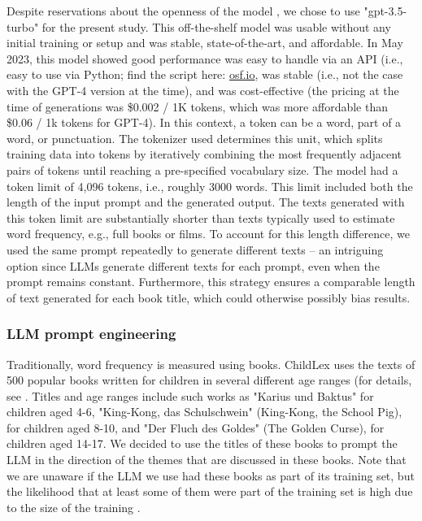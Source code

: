 \documentclass[doc, a4paper]{apa7}
\begin{document}
Despite reservations about the openness of the model \citep[see, e.g., ][]{liesenfeld_opening_2023, hussain_tutorial_2024}, we chose to use "gpt-3.5-turbo" for the present study. This off-the-shelf model was usable without any initial training or setup and was stable, state-of-the-art, and affordable. In May 2023, this model showed good performance was easy to handle via an API (i.e., easy to use via Python; find the script here: \href{https://osf.io/wmuvj/?view_only=06ba6b0ec23248df8a1418add4da05a0}{osf.io}, was stable (i.e., not the case with the GPT-4 version at the time), and was cost-effective (the pricing at the time of generations was \$0.002 / 1K tokens, which was more affordable than \$0.06 / 1k tokens for GPT-4). In this context, a token can be a word, part of a word, or punctuation. The tokenizer used determines this unit, which splits training data into tokens by iteratively combining the most frequently adjacent pairs of tokens until reaching a pre-specified vocabulary size. The model had a token limit of 4,096 tokens, i.e., roughly 3000 words. This limit included both the length of the input prompt and the generated output. The texts generated with this token limit are substantially shorter than texts typically used to estimate word frequency, e.g., full books or films. To account for this length difference, we used the same prompt repeatedly to generate different texts – an intriguing option since LLMs generate different texts for each prompt, even when the prompt remains constant. Furthermore, this strategy ensures a comparable length of text generated for each book title, which could otherwise possibly bias results. 


\subsubsection*{LLM prompt engineering}

Traditionally, word frequency is measured using books. ChildLex uses the texts of 500 popular books written for children in several different age ranges (for details, see \citep{schroeder_childlex_2015}. Titles and age ranges include such works as "Karius und Baktus" for children aged 4-6, "King-Kong, das Schulschwein" (King-Kong, the School Pig), for children aged 8-10, and "Der Fluch des Goldes" (The Golden Curse), for children aged 14-17. We decided to use the titles of these books to prompt the LLM in the direction of the themes that are discussed in these books. Note that we are unaware if the LLM we use had these books as part of its training set, but the likelihood that at least some of them were part of the training set is high due to the size of the training \citep{liu_datasets_2024}.  
 
\end{document}
